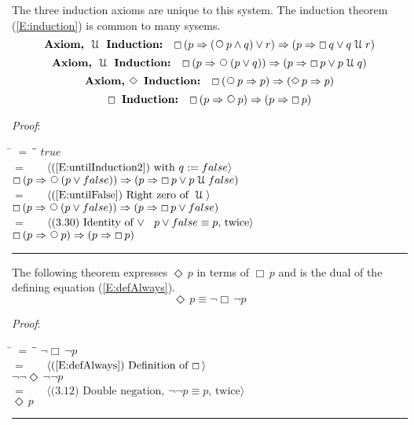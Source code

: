 \documentclass[12pt, fleqn, leqno]{article}
\newcommand{\lgap}{2pt}                             %
\newcommand{\mymathindent}{24pt}                    %
\newcommand{\impl}{\ensuremath{\Rightarrow}}        %
\newcommand{\Until}{\;\mathcal{U}\;}
\newcommand{\Next}{\;\,\text{\raisebox{3.5pt}{\circle{6}}}}
\newcommand{\Event}{\Diamond\,}
\newcommand{\Always}{\Box\,}
\newcommand{\myqed}{\rule[-.23ex]{1.2ex}{2.0ex}}
\newcommand{\myqedtab}{\hspace{384pt}}              %
\newcommand{\Gll} {\langle}                         %
\newcommand{\Ggg} {\rangle}                         %
\newcommand{\Hint}[1]     {\ \ \ $\Gll              \mbox{#1} \Ggg$ }   %
\begin{document}
The three induction axioms are unique to this system.
The induction theorem (\ref{E:induction}) is common to many sysems.
\begin{equation}\label{E:untilInduction1}
\textbf{Axiom, $\Until$ Induction:}\quad \Always (p \impl (\Next p\land q)\lor r) \impl (p \impl \Always q\lor q\Until r)
\end{equation}
\begin{equation}\label{E:untilInduction2}
\textbf{Axiom, $\Until$ Induction:}\quad \Always (p \impl \Next (p\lor q)) \impl (p \impl \Always p\lor p\Until q)
\end{equation}
\begin{equation}\label{E:eventInduction}
\textbf{Axiom, $\Event$ Induction:}\quad \Always (\Next p \impl p) \impl (\Event p \impl p)
\end{equation}
\begin{equation}\label{E:induction}
\textbf{$\Always$ Induction:}\quad \Always (p \impl \Next p) \impl (p \impl \Always p)
\end{equation}

\emph{Proof}:
\begin{tabbing}
\hspace{\mymathindent} \= $= \;$ \= \myqedtab \= \kill
  \> \>   $true$\\[\lgap]
  \> $=$  \>  \Hint{(\ref{E:untilInduction2}) with $q := false$}\\[\lgap]
  \> \>   $\Always (p \impl \Next (p\lor false)) \impl (p \impl \Always p\lor p\Until false)$\\[\lgap]
  \> $=$  \>  \Hint{(\ref{E:untilFalse}) Right zero of $\Until$}\\[\lgap]
  \> \>   $\Always (p \impl \Next (p\lor false)) \impl (p \impl \Always p\lor false)$\\[\lgap]
  \> $=$  \>  \Hint{(3.30) Identity of $\lor$\;\; $p\lor false\equiv p$, twice}\\[\lgap]
  \> \>   $\Always (p \impl \Next p) \impl (p \impl \Always p)$ \quad \myqed
\end{tabbing}

The following theorem expresses $\Event p$ in terms of $\Always p$ and is the dual of the defining equation (\ref{E:defAlways}).
\begin{equation}\label{E:eventAsAlways}
\Event p \equiv \neg\Always\neg p
\end{equation}

\emph{Proof}:
\begin{tabbing}
\hspace{\mymathindent} \= $= \;$ \= \myqedtab \= \kill
  \> \>   $\neg\Always\neg p$\\[\lgap]
  \> $=$  \>  \Hint{(\ref{E:defAlways}) Definition of $\Always$}\\[\lgap]
  \> \>   $\neg\neg\Event\neg\neg p$\\[\lgap]
  \> $=$  \>  \Hint{(3.12) Double negation, $\neg\neg p\equiv p$, twice}\\[\lgap]
  \> \>   $\Event p$ \quad \myqed
\end{tabbing}
\end{document}

